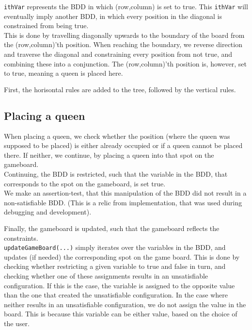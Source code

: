 \texttt{ithVar} represents the BDD in which (row,column) is set to true. This \texttt{ithVar} will eventually imply another BDD, in which every position in the diagonal is constrained from being true. \\
This is done by travelling diagonally upwards to the boundary of the board from the (row,column)'th position. When reaching the boundary, we reverse direction and traverse the diagonal and constraining every position from not true, and combining these into a conjunction. The  (row,column)'th position is, however, set to true, meaning a queen is placed here.


First, the horisontal rules are added to the tree, followed by the vertical rules. 

\subsection{Placing a queen}
When placing a queen, we check whether the position (where the queen was supposed to be placed) is either already occupied or if a queen cannot be placed there. If neither, we continue, by placing a queen into that spot on the gameboard. \\

Continuing, the BDD is restricted, such that the variable in the BDD, that corresponds to the spot on the gameboard, is set true. \\

We make an assertion-test, that this manipulation of the BDD did not result in a non-satisfiable BDD. (This is a relic from implementation, that was used during debugging and development). 

Finally, the gameboard is updated, such that the gameboard reflects the constraints. \\

\texttt{updateGameBoard(...)} simply iterates over the variables in the BDD, and updates (if needed) the corresponding spot on the game board. This is done by checking whether restricting a given variable to true and false in turn, and checking whether one of these assignments results in an unsatisfiable configuration. If this is the case, the variable is assigned to the opposite value than the one that created the unsatisfiable configuration. In the case where neither results in an unsatisfiable configuration, we do not assign the value in the board. This is because this variable can be either value, based on the choice of the user. \\

